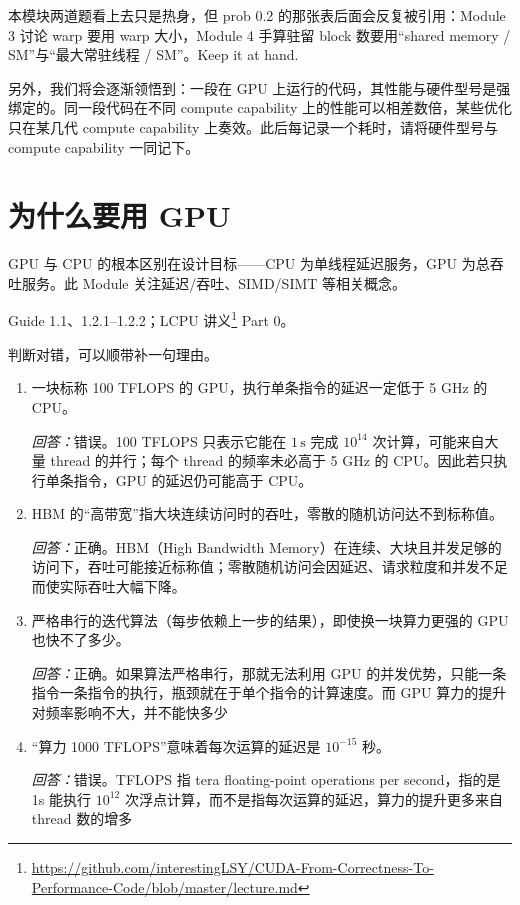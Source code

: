 \documentclass[11pt,a4paper,fontset=none]{ctexart}
\begin{document}
\begin{lookback}
本模块两道题看上去只是热身，但 prob 0.2 的那张表后面会反复被引用：Module 3 讨论 warp 要用 warp 大小，Module 4 手算驻留 block 数要用“shared memory / SM”与“最大常驻线程 / SM”。Keep it at hand.

另外，我们将会逐渐领悟到：一段在 GPU 上运行的代码，其性能与硬件型号是强绑定的。同一段代码在不同 compute capability 上的性能可以相差数倍，某些优化只在某几代 compute capability 上奏效。此后每记录一个耗时，请将硬件型号与 compute capability 一同记下。
\end{lookback}

\section{为什么要用 GPU}

GPU 与 CPU 的根本区别在设计目标——CPU 为单线程延迟服务，GPU 为总吞吐服务。此 Module 关注延迟/吞吐、SIMD/SIMT 等相关概念。

\begin{reading}
Guide 1.1、1.2.1--1.2.2；LCPU 讲义\footnote{\url{https://github.com/interestingLSY/CUDA-From-Correctness-To-Performance-Code/blob/master/lecture.md}} Part 0。
\end{reading}

判断对错，可以顺带补一句理由。
\begin{enumerate}[label=(\alph*)]
  \item 一块标称 100 TFLOPS 的 GPU，执行单条指令的延迟一定低于 5 GHz 的 CPU。
  \par\noindent\textit{回答：}错误。100 TFLOPS 只表示它能在 $1\,\mathrm{s}$ 完成 $10^{14}$ 次计算，可能来自大量 thread 的并行；每个 thread 的频率未必高于 5 GHz 的 CPU。因此若只执行单条指令，GPU 的延迟仍可能高于 CPU。
  \item HBM 的“高带宽”指大块连续访问时的吞吐，零散的随机访问达不到标称值。
  \par\noindent\textit{回答：}正确。HBM（High Bandwidth Memory）在连续、大块且并发足够的访问下，吞吐可能接近标称值；零散随机访问会因延迟、请求粒度和并发不足而使实际吞吐大幅下降。
  \item 严格串行的迭代算法（每步依赖上一步的结果），即使换一块算力更强的 GPU 也快不了多少。
  \par\noindent\textit{回答：}正确。如果算法严格串行，那就无法利用 GPU 的并发优势，只能一条指令一条指令的执行，瓶颈就在于单个指令的计算速度。而 GPU 算力的提升对频率影响不大，并不能快多少
  \item “算力 1000 TFLOPS”意味着每次运算的延迟是 $10^{-15}$ 秒。
  \par\noindent\textit{回答：}错误。TFLOPS 指 tera floating-point operations per second，指的是 1s 能执行 $10^{12}$ 次浮点计算，而不是指每次运算的延迟，算力的提升更多来自 thread 数的增多
\end{enumerate}
\end{document}

